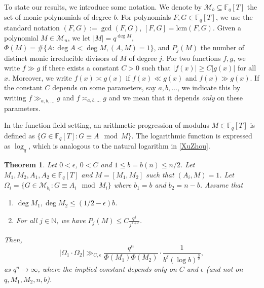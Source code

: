 \documentclass[12pt]{amsart}
\numberwithin{equation}{section}
\newtheorem{theorem}{Theorem}[section]
\theoremstyle{definition}
\theoremstyle{remark}
\newcommand{\FF}{\mathbb{F}}
\newcommand{\NN}{\mathbb{N}}
\newcommand{\lcm}{\mathrm{lcm}}
\begin{document}
    To state our results, we introduce some notation. We denote by $\mathcal{M}_b\subseteq \FF_q[T]$ the set of monic polynomials of degree $b$. For polynomials $F,G \in \FF_q[T]$, we use the standard notation $(F,G) := \gcd (F,G)$, $[F,G] = \lcm(F,G)$. Given a polynomial $M\in \mathcal{M}_n$, we let $|M|=q^{\deg M}$, $\Phi(M) = \#\{ A: \deg A<\deg M, (A,M)=1\}$, and $P_j(M)$ the number of distinct monic irreducible divisors of $M$ of degree $j$.
    For two functions $f,g$, we write $f\gg g$  if there exists a constant $C>0$ such that $|f(x)|\geq C|g(x)|$ for all $x$. Moreover, we write $f(x) \asymp g(x)$ if $f(x) \ll g(x)$ and $f(x) \gg g(x)$. If the constant $C$ depends on some parameters, say $a,b,\ldots$, we indicate this by writing $f\gg_{a,b,\ldots} g$ and $f\asymp_{a,b,\ldots} g$ and we mean that it depends \emph{ only} on these parameters.

    In the function field setting, an arithmetic progression of modulus $M\in \FF_q[T]$ is defined as $\{ G \in \FF_q[T]: G\equiv A \mod M\}$. The logarithmic function is expressed as $\log_{q}$, which is analogous to the natural logarithm in \eqref{XuZhou}. 

    \begin{theorem}\label{thm: divisors on APs}
        Let $0 < \epsilon$, $0 < C$ and $1\leq b=b(n)\leq n/2$. Let $M_1,M_2, A_1,A_2 \in \FF_q[T]$ and $M=[M_1,M_2]$ such that $(A_i,M)=1$.
        Let $\Omega_i = \{ G\in \mathcal{M}_{b_i}: G \equiv A_i\mod M_i\}$ where $b_1=b$ and $b_2=n-b$. 
        Assume that 
        \begin{enumerate}[label={\arabic*.}]
            \item $\deg M_1 , \deg M_2\leq (1/2-\epsilon) b$.
            \item For all $j\in\NN$, we have $P_j(M)\leq C \frac{q^j}   {j^{1+\epsilon}}$. \label{eq:consition_Pj}
        \end{enumerate}
        Then, 
        \begin{equation}\label{mainresult}
            |\Omega_1\cdot \Omega_2| \gg_{C,\epsilon} \frac{q^n}{\Phi(M_1)  \Phi(M_2)}\cdot \frac{1}{b^{\delta}(\log b)^{\frac32}},
        \end{equation}
        as $q^n\to \infty$, where the implied constant depends only on $C$ and $\epsilon$ (and not on $q,M_1,M_2,n,b$).
    \end{theorem}    
\end{document}

